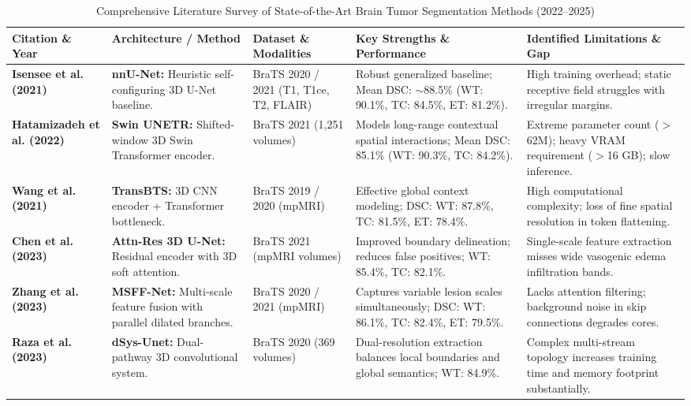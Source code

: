 \documentclass[conference]{IEEEtran}
\begin{document}
\begin{table}[t]
\centering
\caption{Comprehensive Literature Survey of State-of-the-Art Brain Tumor Segmentation Methods (2022--2025)}
\label{tab:literature_survey}
\begin{tabular}{p{2.6cm}p{3.2cm}p{2.8cm}p{4.2cm}p{3.8cm}}
\toprule
\textbf{Citation \& Year} & \textbf{Architecture / Method} & \textbf{Dataset \& Modalities} & \textbf{Key Strengths \& Performance} & \textbf{Identified Limitations \& Gap} \\
\midrule
\textbf{Isensee et al. (2021) \cite{isensee2021nnu}} & \textbf{nnU-Net:} Heuristic self-configuring 3D U-Net baseline. & BraTS 2020 / 2021 (T1, T1ce, T2, FLAIR) & Robust generalized baseline; Mean DSC: $\sim$88.5\% (WT: 90.1\%, TC: 84.5\%, ET: 81.2\%). & High training overhead; static receptive field struggles with irregular margins. \\
\midrule
\textbf{Hatamizadeh et al. (2022) \cite{hatamizadeh2022swin}} & \textbf{Swin UNETR:} Shifted-window 3D Swin Transformer encoder. & BraTS 2021 (1,251 volumes) & Models long-range contextual spatial interactions; Mean DSC: 85.1\% (WT: 90.3\%, TC: 84.2\%). & Extreme parameter count ($>$62M); heavy VRAM requirement ($>$16 GB); slow inference. \\
\midrule
\textbf{Wang et al. (2021) \cite{wang2021transbts}} & \textbf{TransBTS:} 3D CNN encoder + Transformer bottleneck. & BraTS 2019 / 2020 (mpMRI) & Effective global context modeling; DSC: WT: 87.8\%, TC: 81.5\%, ET: 78.4\%. & High computational complexity; loss of fine spatial resolution in token flattening. \\
\midrule
\textbf{Chen et al. (2023) \cite{chen2023attention}} & \textbf{Attn-Res 3D U-Net:} Residual encoder with 3D soft attention. & BraTS 2021 (mpMRI volumes) & Improved boundary delineation; reduces false positives; WT: 85.4\%, TC: 82.1\%. & Single-scale feature extraction misses wide vasogenic edema infiltration bands. \\
\midrule
\textbf{Zhang et al. (2023) \cite{zhang2023multi}} & \textbf{MSFF-Net:} Multi-scale feature fusion with parallel dilated branches. & BraTS 2020 / 2021 (mpMRI) & Captures variable lesion scales simultaneously; DSC: WT: 86.1\%, TC: 82.4\%, ET: 79.5\%. & Lacks attention filtering; background noise in skip connections degrades cores. \\
\midrule
\textbf{Raza et al. (2023) \cite{raza2023dsys}} & \textbf{dSys-Unet:} Dual-pathway 3D convolutional system. & BraTS 2020 (369 volumes) & Dual-resolution extraction balances local boundaries and global semantics; WT: 84.9\%. & Complex multi-stream topology increases training time and memory footprint substantially. \\

\end{tabular}
\end{table}
\end{document}
